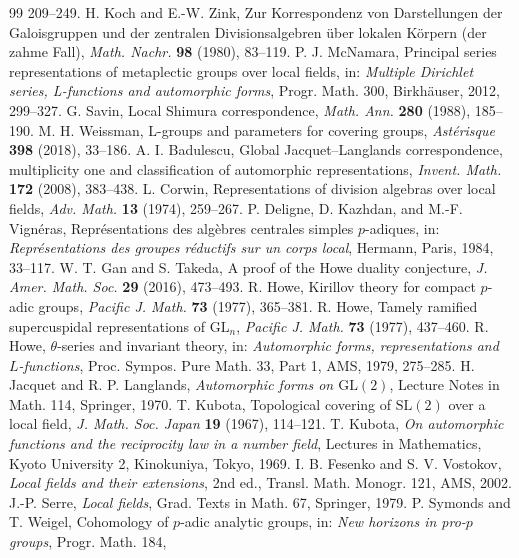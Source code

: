 \documentclass[11pt]{article}
\theoremstyle{plain}
\theoremstyle{definition}
\begin{document}
\begin{thebibliography}{99}
209--249.
 H. Koch and E.-W. Zink, Zur Korrespondenz von
Darstellungen der Galoisgruppen und der zentralen Divisionsalgebren
\"uber lokalen K\"orpern (der zahme Fall), \emph{Math. Nachr.}
\textbf{98} (1980), 83--119.
 P. J. McNamara, Principal series representations of
metaplectic groups over local fields, in: \emph{Multiple Dirichlet
series, L-functions and automorphic forms}, Progr. Math. 300,
Birkh\"auser, 2012, 299--327.
 G. Savin, Local Shimura correspondence, \emph{Math. Ann.}
\textbf{280} (1988), 185--190.
 M. H. Weissman, L-groups and parameters for covering
groups, \emph{Ast\'erisque} \textbf{398} (2018), 33--186.
 A. I. Badulescu, Global Jacquet--Langlands correspondence,
multiplicity one and classification of automorphic representations,
\emph{Invent. Math.} \textbf{172} (2008), 383--438.
 L. Corwin, Representations of division algebras over local
fields, \emph{Adv. Math.} \textbf{13} (1974), 259--267.
 P. Deligne, D. Kazhdan, and M.-F. Vign\'eras,
Repr\'esentations des alg\`ebres centrales simples $p$-adiques, in:
\emph{Repr\'esentations des groupes r\'eductifs sur un corps local},
Hermann, Paris, 1984, 33--117.
 W. T. Gan and S. Takeda, A proof of the Howe duality
conjecture, \emph{J. Amer. Math. Soc.} \textbf{29} (2016), 473--493.
 R. Howe, Kirillov theory for compact $p$-adic groups,
\emph{Pacific J. Math.} \textbf{73} (1977), 365--381.
 R. Howe, Tamely ramified supercuspidal representations
of $\mathrm{GL}_n$, \emph{Pacific J. Math.} \textbf{73} (1977), 437--460.
 R. Howe, $\theta$-series and invariant theory, in:
\emph{Automorphic forms, representations and $L$-functions}, Proc.
Sympos. Pure Math. 33, Part 1, AMS, 1979, 275--285.
 H. Jacquet and R. P. Langlands, \emph{Automorphic forms on
$\mathrm{GL}(2)$}, Lecture Notes in Math. 114, Springer, 1970.
 T. Kubota, Topological covering of $\mathrm{SL}(2)$ over a
local field, \emph{J. Math. Soc. Japan} \textbf{19} (1967), 114--121.
 T. Kubota, \emph{On automorphic functions and the
reciprocity law in a number field}, Lectures in Mathematics, Kyoto
University 2, Kinokuniya, Tokyo, 1969.
 I. B. Fesenko and S. V. Vostokov, \emph{Local fields and
their extensions}, 2nd ed., Transl. Math. Monogr. 121, AMS, 2002.
 J.-P. Serre, \emph{Local fields}, Grad. Texts in Math.
67, Springer, 1979.
 P. Symonds and T. Weigel, Cohomology of $p$-adic analytic
groups, in: \emph{New horizons in pro-$p$ groups}, Progr. Math. 184,

\end{thebibliography}
\end{document}
